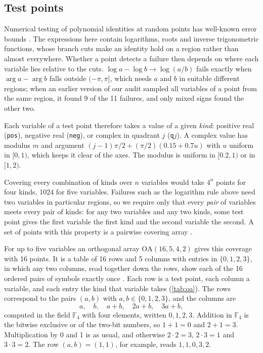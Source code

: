 \documentclass[11pt]{amsart}
\theoremstyle{definition}
\theoremstyle{remark}
\begin{document}
\subsection{Test points}

Numerical testing of polynomial identities at random points has well-known
error bounds \cite{Schwartz80,Zippel79}. The expressions here contain
logarithms, roots and inverse trigonometric functions, whose branch cuts
make an identity hold on a region rather than almost everywhere. Whether a
point detects a failure then depends on where each variable lies relative to
the cuts. $\log a - \log b \to \log(a/b)$ fails exactly when $\arg a - \arg b$
falls outside $(-\pi, \pi]$, which needs $a$ and $b$ in suitable different
regions; when an earlier version of our audit sampled all
variables of a point from the same region, it found 9 of the 11 failures,
and only mixed signs found the other two.

Each variable of a test point therefore takes a value of a given
\emph{kind}: positive real (\texttt{pos}), negative real (\texttt{neg}), or
complex in quadrant $j$ (\texttt{q}$j$). A complex value has modulus $m$
and argument $(j-1)\pi/2 + (\pi/2)(0.15 + 0.7u)$ with $u$ uniform in
$[0,1)$, which keeps it clear of the axes. The modulus is uniform in
$[0.2, 1)$ or in $[1, 2)$.

Covering every combination of kinds over $n$ variables would take $4^n$
points for four kinds, 1024 for five variables. Failures such as the
logarithm rule above need two variables in particular regions, so we
require only that every \emph{pair} of variables meets every pair of kinds:
for any two variables and any two kinds, some test point gives the first
variable the first kind and the second variable the second. A set of points
with this property is a pairwise covering array \cite{Cohen97}.

For up to five variables an orthogonal array $\mathrm{OA}(16,5,4,2)$ gives
this coverage with 16 points. It is a table of 16 rows and 5 columns with
entries in $\{0,1,2,3\}$, in which any two columns, read together down the
rows, show each of the 16 ordered pairs of symbols exactly once
\cite{HedayatSloaneStufken99}. Each row is a test point, each column a
variable, and each entry the kind that variable takes (\cref{tab:oa}). The
rows correspond to the pairs $(a, b)$ with $a, b \in \{0,1,2,3\}$, and the
columns are
\[
  a,\quad b,\quad a + b,\quad 2a + b,\quad 3a + b,
\]
computed in the field $\mathbb{F}_4$ with four elements, written
$0, 1, 2, 3$. Addition in $\mathbb{F}_4$ is the bitwise exclusive or of the
two-bit numbers, so $1 + 1 = 0$ and $2 + 1 = 3$. Multiplication by 0 and 1
is as usual, and otherwise $2 \cdot 2 = 3$, $2 \cdot 3 = 1$ and
$3 \cdot 3 = 2$. The row $(a, b) = (1, 1)$, for example, reads
$1, 1, 0, 3, 2$.
\end{document}
